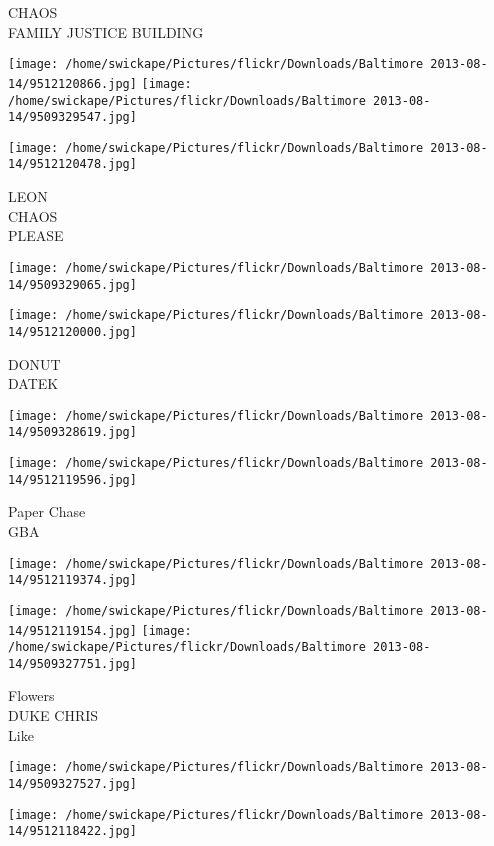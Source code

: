 \documentclass[10pt,letterpaper]{article}
\begin{document}
CHAOS\\
FAMILY JUSTICE BUILDING
\pagebreak

\texttt{[image: /home/swickape/Pictures/flickr/Downloads/Baltimore 2013-08-14/9512120866.jpg]}
\texttt{[image: /home/swickape/Pictures/flickr/Downloads/Baltimore 2013-08-14/9509329547.jpg]}

\vspace{0.25in}
\texttt{[image: /home/swickape/Pictures/flickr/Downloads/Baltimore 2013-08-14/9512120478.jpg]}

LEON\\
CHAOS\\
PLEASE
\pagebreak

\texttt{[image: /home/swickape/Pictures/flickr/Downloads/Baltimore 2013-08-14/9509329065.jpg]}

\vspace{0.25in}
\texttt{[image: /home/swickape/Pictures/flickr/Downloads/Baltimore 2013-08-14/9512120000.jpg]}

DONUT\\
DATEK
\pagebreak

\texttt{[image: /home/swickape/Pictures/flickr/Downloads/Baltimore 2013-08-14/9509328619.jpg]}

\vspace{0.25in}
\texttt{[image: /home/swickape/Pictures/flickr/Downloads/Baltimore 2013-08-14/9512119596.jpg]}

Paper Chase\\
GBA
\pagebreak

\texttt{[image: /home/swickape/Pictures/flickr/Downloads/Baltimore 2013-08-14/9512119374.jpg]}

\vspace{0.25in}
\texttt{[image: /home/swickape/Pictures/flickr/Downloads/Baltimore 2013-08-14/9512119154.jpg]}
\texttt{[image: /home/swickape/Pictures/flickr/Downloads/Baltimore 2013-08-14/9509327751.jpg]}

Flowers\\
DUKE CHRIS\\
Like
\pagebreak

\texttt{[image: /home/swickape/Pictures/flickr/Downloads/Baltimore 2013-08-14/9509327527.jpg]}

\vspace{0.25in}
\texttt{[image: /home/swickape/Pictures/flickr/Downloads/Baltimore 2013-08-14/9512118422.jpg]}
\end{document}
